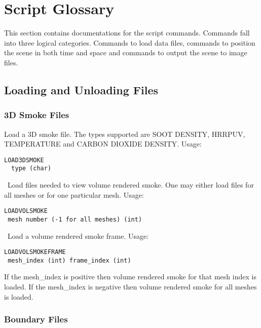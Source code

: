 \documentclass[11pt,twoside]{book}
\newcommand{\parma}{.75}
\newcommand{\parmb}{.5}
\newcommand{\parmc}{0.25}
\newcommand{\blist}{
\begin{list}
{}{
\setlength{\leftmargin}{\parma in}
\setlength{\labelwidth}{\parmb in}
\setlength{\labelsep}{\parmc in}
\setlength{\listparindent}{0.3in}
\setlength{\topsep}{.3in}
\setlength{\parsep}{.0in}
}}
\newcommand{\elist}{\end{list}}
\begin{document}
\section{Script Glossary}

This section contains documentations for the script commands.
Commands fall into three logical categories.  Commands
to load data files, commands to position the scene in both time and space
and commands to output the scene to image files.

\subsection{Loading and Unloading Files}
\subsubsection{3D Smoke Files}
\blist

Load a 3D smoke file.  The types supported are
SOOT DENSITY, HRRPUV,\\
TEMPERATURE and CARBON DIOXIDE DENSITY.
Usage:
\begin{lstlisting}
LOAD3DSMOKE
  type (char)
\end{lstlisting}

\ Load files needed to view volume rendered
smoke.  One may either load files for all meshes or for one
particular mesh.  Usage:
\begin{lstlisting}
LOADVOLSMOKE
 mesh number (-1 for all meshes) (int)
 \end{lstlisting}


\ Load a volume rendered smoke frame.
Usage:
\begin{lstlisting}
LOADVOLSMOKEFRAME
 mesh_index (int) frame_index (int)
\end{lstlisting}
If the mesh\_index is positive then volume rendered smoke for that
mesh index is loaded. If the mesh\_index is negative then volume
rendered smoke for all meshes is loaded.

\elist

\subsubsection{Boundary Files}
\end{document}

